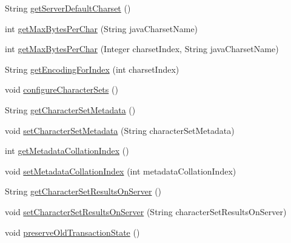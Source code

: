 \begin{DoxyCompactItemize}
\item 
String \mbox{\hyperlink{classcom_1_1mysql_1_1cj_1_1protocol_1_1a_1_1_native_server_session_ad663008943ab8a1188490e3ba0befe95}{get\+Server\+Default\+Charset}} ()
\item 
int \mbox{\hyperlink{classcom_1_1mysql_1_1cj_1_1protocol_1_1a_1_1_native_server_session_ad7465b48803efa279712a08e64bb4cd1}{get\+Max\+Bytes\+Per\+Char}} (String java\+Charset\+Name)
\item 
int \mbox{\hyperlink{classcom_1_1mysql_1_1cj_1_1protocol_1_1a_1_1_native_server_session_af9ca6638e8879ecf64d7a09eb70420d4}{get\+Max\+Bytes\+Per\+Char}} (Integer charset\+Index, String java\+Charset\+Name)
\item 
String \mbox{\hyperlink{classcom_1_1mysql_1_1cj_1_1protocol_1_1a_1_1_native_server_session_a3a9d807f5e66892f234d06934d275de1}{get\+Encoding\+For\+Index}} (int charset\+Index)
\item 
void \mbox{\hyperlink{classcom_1_1mysql_1_1cj_1_1protocol_1_1a_1_1_native_server_session_afb85710d7264a784f27133cec2eaf811}{configure\+Character\+Sets}} ()
\item 
String \mbox{\hyperlink{classcom_1_1mysql_1_1cj_1_1protocol_1_1a_1_1_native_server_session_ae60251435377bb750534dd50526e06bb}{get\+Character\+Set\+Metadata}} ()
\item 
void \mbox{\hyperlink{classcom_1_1mysql_1_1cj_1_1protocol_1_1a_1_1_native_server_session_a3820f7525abbc47c614a2f1ffa794475}{set\+Character\+Set\+Metadata}} (String character\+Set\+Metadata)
\item 
int \mbox{\hyperlink{classcom_1_1mysql_1_1cj_1_1protocol_1_1a_1_1_native_server_session_ab7cb9e9b9e758a4bea17d5a7e3889463}{get\+Metadata\+Collation\+Index}} ()
\item 
void \mbox{\hyperlink{classcom_1_1mysql_1_1cj_1_1protocol_1_1a_1_1_native_server_session_ac50b43fb6e344f4b040cad7131f84ed6}{set\+Metadata\+Collation\+Index}} (int metadata\+Collation\+Index)
\item 
String \mbox{\hyperlink{classcom_1_1mysql_1_1cj_1_1protocol_1_1a_1_1_native_server_session_a6a563b249faf740d89dc4cf8be9dd0c7}{get\+Character\+Set\+Results\+On\+Server}} ()
\item 
void \mbox{\hyperlink{classcom_1_1mysql_1_1cj_1_1protocol_1_1a_1_1_native_server_session_a8b4347b3013dbe54d67b318815008340}{set\+Character\+Set\+Results\+On\+Server}} (String character\+Set\+Results\+On\+Server)
\item 
void \mbox{\hyperlink{classcom_1_1mysql_1_1cj_1_1protocol_1_1a_1_1_native_server_session_a17eedbc99f68f8306dd9855c7f55c5ec}{preserve\+Old\+Transaction\+State}} ()

\end{DoxyCompactItemize}
